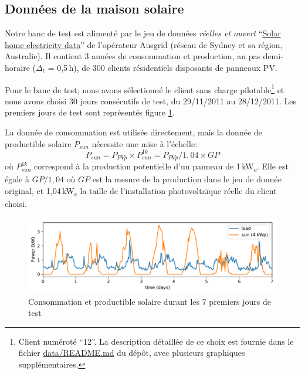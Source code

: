 \documentclass[a4paper,10pt,twocolumn]{article}
\newcommand\sub[1]{\textsubscript{#1}}
\newcommand\kWc{kW\sub{c}{}}
\begin{document}
\subsection{Données de la maison solaire}
\label{ss:sol_data}

Notre banc de test est alimenté par le jeu de données \emph{réelles et ouvert}
``\href{https://www.ausgrid.com.au/Common/About-us/Corporate-information/Data-to-share/Solar-home-electricity-data.aspx}{Solar home electricity data}''
de l'opérateur Ausgrid (réseau de Sydney et sa région, Australie).
Il contient 3 années de consommation et production, au pas demi-horaire ($\Delta_t$ = 0,5\,h),
de 300 clients résidentiels disposants de panneaux PV.

Pour le banc de test, nous avons sélectionné le client sans charge pilotable\footnote{
  Client numéroté ``12''. La description détaillée de ce choix est fournie dans le fichier \href{https://github.com/pierre-haessig/solarhome-control-bench/blob/master/data/README.md}{data/README.md} du dépôt, avec plusieurs graphiques supplémentaires.
}
et nous avons choisi 30 jours consécutifs de test, du 29/11/2011 au 28/12/2011.
Les premiers jours de test sont représentés figure \ref{fig:testdata}.

La donnée de consommation est utilisée directement, mais
la donnée de productible solaire $P_{sun}$ nécessite une mise à l'échelle:
\begin{equation}
  P_{sun} = P_{PVp} \times P_{sun}^{1k} = P_{PVp}/1,04 \times GP 
\end{equation}
%
où $P_{sun}^{1k}$ correspond à la production potentielle d'un panneau de 1\,\kWc.
Elle est égale à $GP/1,04$ où $GP$ est la mesure de la production
dans le jeu de donnée original, et 1,04\,\kWc{} la taille de l'installation photovoltaïque
réelle du client choisi.

\begin{figure}[!ht]
        \begin{center}
                \includegraphics[width=1\columnwidth]{figures/data_week_2011-11-29.pdf}
        \end{center}

        \caption{Consommation et productible solaire durant les 7 premiers jours de test
        }
        \label{fig:testdata}
\end{figure}
\end{document}
